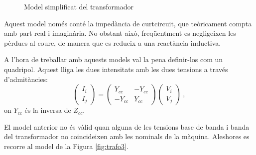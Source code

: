 \begin{figure}[!htb] \footnotesize
    \begin{center}
    \caption{Model simplificat del transformador}
    \label{fig:trafo2}
    \end{center}
    \end{figure}
Aquest model només conté la impedància de curtcircuit, que teòricament compta amb part real i imaginària. No obstant això, freqüentment es negligeixen les pèrdues al coure, de manera que es redueix a una reactància inductiva.

A l'hora de treballar amb aquests models val la pena definir-los com un quadripol. Aquest lliga les dues intensitats amb les dues tensions a través d'admitàncies:
\begin{equation}
    \begin{pmatrix}
        I_i \\
        I_j 
    \end{pmatrix}
    =
    \begin{pmatrix}
        Y_{cc} & -Y_{cc} \\
        -Y_{cc} & Y_{cc} 
    \end{pmatrix}
    \begin{pmatrix}
        V_i \\
        V_j
    \end{pmatrix}\ ,
    \label{eq:quadri1}
\end{equation}
on $Y_{cc}$ és la inversa de $Z_{cc}$.

El model anterior no és vàlid quan alguna de les tensions base de banda i banda del transformador no coincideixen amb les nominals de la màquina. Aleshores es recorre al model de la Figura \ref{fig:trafo3}. 


